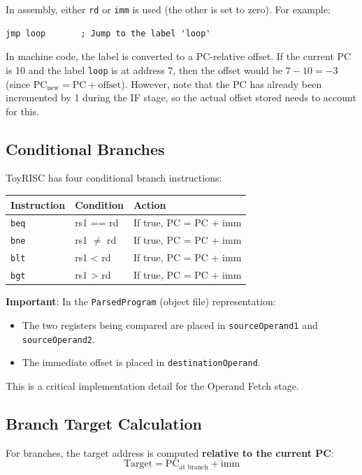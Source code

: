 \documentclass[12pt,a4paper]{article}
\begin{document}
In assembly, either \texttt{rd} or \texttt{imm} is used (the other is set to zero). For example:
\begin{lstlisting}[style=asmstyle]
jmp loop       ; Jump to the label 'loop'
\end{lstlisting}

In machine code, the label is converted to a PC-relative offset. If the current PC is 10 and the label \texttt{loop} is at address 7, then the offset would be $7 - 10 = -3$ (since $\text{PC}_{\text{new}} = \text{PC} + \text{offset}$). However, note that the PC has already been incremented by 1 during the IF stage, so the actual offset stored needs to account for this.

\subsection{Conditional Branches}

ToyRISC has four conditional branch instructions:

\begin{longtable}{p{2cm}p{3cm}p{8cm}}
\toprule
\textbf{Instruction} & \textbf{Condition} & \textbf{Action} \\
\midrule
\texttt{beq} & rs1 == rd & If true, PC = PC + imm \\
\texttt{bne} & rs1 $\neq$ rd & If true, PC = PC + imm \\
\texttt{blt} & rs1 < rd & If true, PC = PC + imm \\
\texttt{bgt} & rs1 > rd & If true, PC = PC + imm \\
\bottomrule
\end{longtable}

\textbf{Important}: In the \texttt{ParsedProgram} (object file) representation:
\begin{itemize}
    \item The two registers being compared are placed in \texttt{sourceOperand1} and \texttt{sourceOperand2}.
    \item The immediate offset is placed in \texttt{destinationOperand}.
\end{itemize}

This is a critical implementation detail for the Operand Fetch stage.

\subsection{Branch Target Calculation}

For branches, the target address is computed \textbf{relative to the current PC}:
\[
\text{Target} = \text{PC}_{\text{at branch}} + \text{imm}
\]
\end{document}
